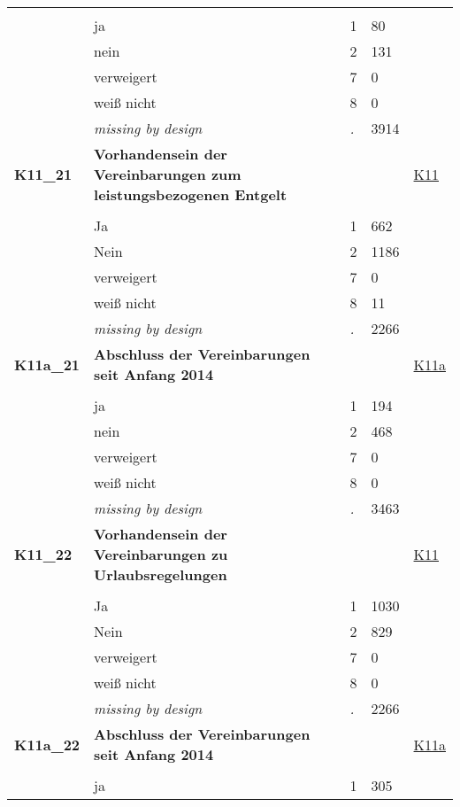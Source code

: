 \begin{longtable}{| L{2.65cm} | L{8cm} | C{1.5cm} | R{1.25cm} | C{2.25cm}  |}
   &  &  &  &  \\ 
   & ja & 1 & 80 &  \\ 
   & nein & 2 & 131 &  \\ 
   & verweigert & 7 & 0 &  \\ 
   & weiß nicht & 8 & 0 &  \\ 
   & \textit{missing by design} & \textit{.} & 3914 &  \\ 
   \midrule
\textbf{K11\_21}\label{var:K11:21} & \textbf{Vorhandensein der Vereinbarungen zum leistungsbezogenen Entgelt} &  &  & \hyperref[K11]{K11} \\ 
   &  &  &  &  \\ 
   & Ja & 1 & 662 &  \\ 
   & Nein & 2 & 1186 &  \\ 
   & verweigert & 7 & 0 &  \\ 
   & weiß nicht & 8 & 11 &  \\ 
   & \textit{missing by design} & \textit{.} & 2266 &  \\ 
   \midrule
\textbf{K11a\_21}\label{var:K11a:21} & \textbf{Abschluss der Vereinbarungen seit Anfang 2014} &  &  & \hyperref[K11a]{K11a} \\ 
   &  &  &  &  \\ 
   & ja & 1 & 194 &  \\ 
   & nein & 2 & 468 &  \\ 
   & verweigert & 7 & 0 &  \\ 
   & weiß nicht & 8 & 0 &  \\ 
   & \textit{missing by design} & \textit{.} & 3463 &  \\ 
   \midrule
\textbf{K11\_22}\label{var:K11:22} & \textbf{Vorhandensein der Vereinbarungen zu Urlaubsregelungen} &  &  & \hyperref[K11]{K11} \\ 
   &  &  &  &  \\ 
   & Ja & 1 & 1030 &  \\ 
   & Nein & 2 & 829 &  \\ 
   & verweigert & 7 & 0 &  \\ 
   & weiß nicht & 8 & 0 &  \\ 
   & \textit{missing by design} & \textit{.} & 2266 &  \\ 
   \midrule
\textbf{K11a\_22}\label{var:K11a:22} & \textbf{Abschluss der Vereinbarungen seit Anfang 2014} &  &  & \hyperref[K11a]{K11a} \\ 
   &  &  &  &  \\ 
   & ja & 1 & 305 &  \\ 

\end{longtable}
